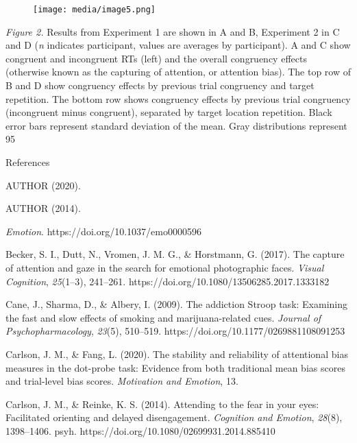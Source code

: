 \documentclass{article}
\begin{document}
{	\begin{figure}
		\caption{}

		\label{fig:rId15}

		\texttt{[image: media/image5.png]}
	\end{figure}



	\emph{Figure 2. }Results from Experiment 1 are shown in A and B, Experiment 2 in C and D (\emph{n} indicates participant, values are averages by participant). A and C show congruent and incongruent RTs (left) and the overall congruency effects (otherwise known as the capturing of attention, or attention bias). The top row of B and D show congruency effects by previous trial congruency and target repetition. The bottom row shows congruency effects by previous trial congruency (incongruent minus congruent), separated by target location repetition. Black error bars represent standard deviation of the mean. Gray distributions represent 95%







	References



	AUTHOR (2020).



	AUTHOR (2014).



	\emph{Emotion}. https://doi.org/10.1037/emo0000596



	Becker, S. I., Dutt, N., Vromen, J. M. G., & Horstmann, G. (2017). The capture of attention and gaze in the search for emotional photographic faces. \emph{Visual Cognition}, \emph{25}(1–3), 241–261. https://doi.org/10.1080/13506285.2017.1333182



	Cane, J., Sharma, D., & Albery, I. (2009). The addiction Stroop task: Examining the fast and slow effects of smoking and marijuana-related cues. \emph{Journal of Psychopharmacology}, \emph{23}(5), 510–519. https://doi.org/10.1177/0269881108091253



	Carlson, J. M., & Fang, L. (2020). The stability and reliability of attentional bias measures in the dot-probe task: Evidence from both traditional mean bias scores and trial-level bias scores. \emph{Motivation and Emotion}, 13.



	Carlson, J. M., & Reinke, K. S. (2014). Attending to the fear in your eyes: Facilitated orienting and delayed disengagement. \emph{Cognition and Emotion}, \emph{28}(8), 1398–1406. psyh. https://doi.org/10.1080/02699931.2014.885410



}
\end{document}
